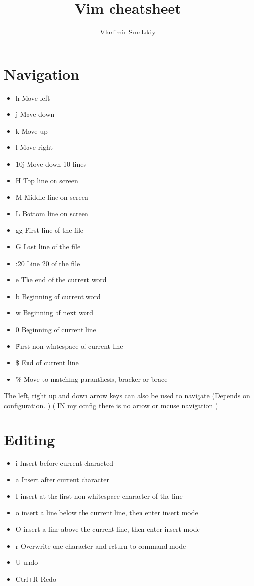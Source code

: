 \documentclass{article}
\author{Vladimir Smolskiy}
\title {Vim cheatsheet}
\begin{document}
\maketitle
\section{Navigation}
 \begin{itemize}
\item h	Move left
\item j	Move down
\item k	Move up
\item l	Move right
\item 10j Move down 10 lines
\item H	Top line on screen
\item M	Middle line on screen
\item L	Bottom line on screen
\item gg First line of the file
\item G	Last line of the file
\item :20 Line 20 of the file
\item e	The end of the current word
\item b	Beginning of current word
\item w	Beginning of next word
\item 0	Beginning of current line
\item \^ First non-whitespace of current line
\item \$ End of current line
\item \% Move to matching paranthesis, bracker or brace
\end{itemize}
The left, right up and down arrow keys can also be used to navigate (Depends on configuration. ) ( IN my config there is no arrow or mouse navigation )

\section{Editing}
\begin{itemize}
\item i Insert before current characted
\item a Insert after current character
\item	I insert at the first non-whitespace character of the line
\item  o insert a line below the current line, then enter insert mode
\item        	O insert a line above the current line, then enter insert mode
\item        	r Overwrite one character and return to command mode
\item        	U undo
\item        	Ctrl+R Redo
\end{itemize}
\end{document}
